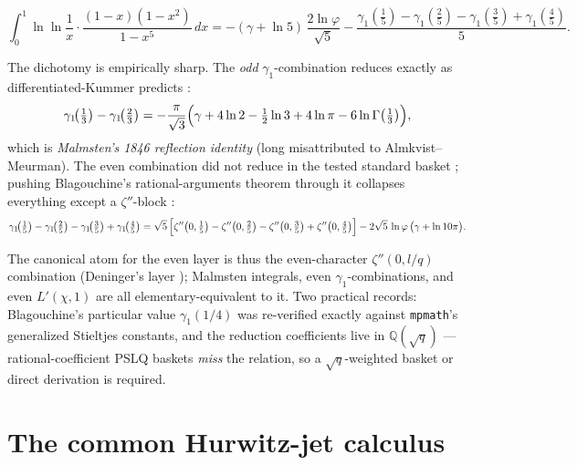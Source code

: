 \begin{result}\label{integral:res:evenchi}
\[
\int_0^1\ln\ln\frac1x\cdot\frac{(1-x)(1-x^2)}{1-x^5}\,dx
=-(\gamma+\ln5)\,\frac{2\ln\varphi}{\sqrt5}
-\frac{\gamma_1(\tfrac15)-\gamma_1(\tfrac25)-\gamma_1(\tfrac35)+\gamma_1(\tfrac45)}{5}.
\]
\end{result}

\begin{result}\label{integral:res:parity}
The dichotomy is empirically sharp. The \emph{odd} $\gamma_1$-combination reduces exactly
as differentiated-Kummer predicts :
\[
\gamma_1\!\bigl(\tfrac13\bigr)-\gamma_1\!\bigl(\tfrac23\bigr)
=-\frac{\pi}{\sqrt3}\Bigl(\gamma+4\ln2-\tfrac12\ln3+4\ln\pi-6\ln\Gamma\bigl(\tfrac13\bigr)\Bigr),
\]
which is \emph{Malmsten's 1846 reflection identity} \cite{bridge:Malmsten} (long misattributed
to Almkvist--Meurman). The even combination did not reduce in the tested standard basket
; pushing Blagouchine's
rational-arguments theorem \cite{bridge:BlagouchineJNT} through it collapses everything except a $\zeta''$-block
:
\[
\gamma_1\!\bigl(\tfrac15\bigr)-\gamma_1\!\bigl(\tfrac25\bigr)
-\gamma_1\!\bigl(\tfrac35\bigr)+\gamma_1\!\bigl(\tfrac45\bigr)
=\sqrt5\,\Bigl[\zeta''\bigl(0,\tfrac15\bigr)-\zeta''\bigl(0,\tfrac25\bigr)
-\zeta''\bigl(0,\tfrac35\bigr)+\zeta''\bigl(0,\tfrac45\bigr)\Bigr]
-2\sqrt5\,\ln\varphi\,\bigl(\gamma+\ln10\pi\bigr).
\]
\end{result}

The canonical atom for the even layer is thus the even-character $\zeta''(0,l/q)$
combination (Deninger's layer \cite{bridge:Deninger}); Malmsten integrals, even $\gamma_1$-combinations, and even
$L'(\chi,1)$ are all elementary-equivalent to it. Two practical records: Blagouchine's
particular value $\gamma_1(1/4)$ was re-verified exactly against \texttt{mpmath}'s
generalized Stieltjes constants, and the reduction coefficients live in
$\mathbb{Q}(\sqrt q)$ --- rational-coefficient PSLQ baskets \emph{miss} the relation, so a
$\sqrt q$-weighted basket or direct derivation is required.
\section{The common Hurwitz-jet calculus}\label{stieltjes:sec:intro}

